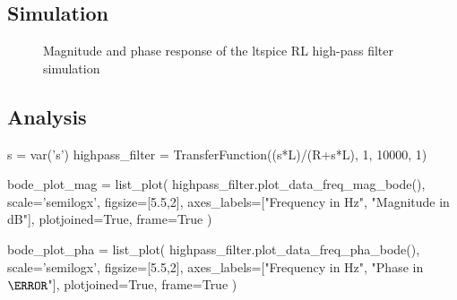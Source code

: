 \subsection{Simulation}


\begin{figure}[H]
    \centering
    \begin{subfigure}{\textwidth}
        \centering
    \end{subfigure}
    \quad
    \begin{subfigure}{\textwidth}
        \centering
    \end{subfigure}
    \caption{Magnitude and phase response of the ltspice RL high-pass filter simulation}
\end{figure}

\subsection{Analysis}

\begin{sagesilent}
    s = var('s')
    highpass_filter = TransferFunction((s*L)/(R+s*L), 1, 10000, 1)

    bode_plot_mag = list_plot(
        highpass_filter.plot_data_freq_mag_bode(),
        scale='semilogx',
        figsize=[5.5,2],
        axes_labels=["Frequency in Hz", "Magnitude in dB"],
        plotjoined=True,
        frame=True
    )

    bode_plot_pha = list_plot(
        highpass_filter.plot_data_freq_pha_bode(),
        scale='semilogx',
        figsize=[5.5,2],
        axes_labels=["Frequency in Hz", "Phase in $\degree$"],
        plotjoined=True,
        frame=True
    )
\end{sagesilent}

